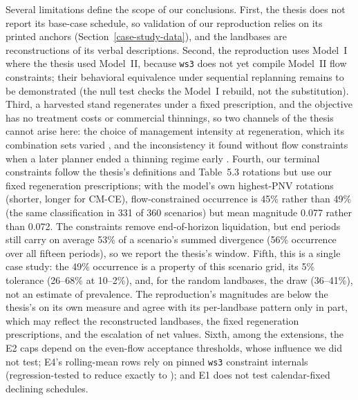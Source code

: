 Several limitations define the scope of our conclusions. First, the thesis does not report its base-case schedule, so validation of our reproduction relies on its printed anchors (Section~\ref{case-study-data}), and the landbases are reconstructions of its verbal descriptions. Second, the reproduction uses Model~I where the thesis used Model~II, because \texttt{ws3} does not yet compile Model~II flow constraints; their behavioral equivalence under sequential replanning remains to be demonstrated (the null test checks the Model~I rebuild, not the substitution). Third, a harvested stand regenerates under a fixed prescription, and the objective has no treatment costs or commercial thinnings, so two channels of the thesis cannot arise here: the choice of management intensity at regeneration, which its combination sets varied \citep[pp.~74, 81]{daugherty1991credibility}, and the inconsistency it found without flow constraints when a later planner ended a thinning regime early \citep[p.~123]{daugherty1991credibility}. Fourth, our terminal constraints follow the thesis's definitions and Table~5.3 rotations but use our fixed regeneration prescriptions; with the model's own highest-PNV rotations (shorter, longer for CM-CE), flow-constrained occurrence is 45\% rather than 49\% (the same classification in 331 of 360 scenarios) but mean magnitude 0.077 rather than 0.072. The constraints remove end-of-horizon liquidation, but end periods still carry on average 53\% of a scenario's summed divergence (56\% occurrence over all fifteen periods), so we report the thesis's window. Fifth, this is a single case study: the 49\% occurrence is a property of this scenario grid, its 5\% tolerance (26--68\% at 10--2\%), and, for the random landbases, the draw (36--41\%), not an estimate of prevalence. The reproduction's magnitudes are below the thesis's on its own measure and agree with its per-landbase pattern only in part, which may reflect the reconstructed landbases, the fixed regeneration prescriptions, and the escalation of net values. Sixth, among the extensions, the E2 caps depend on the even-flow acceptance thresholds, whose influence we did not test; E4's rolling-mean rows rely on pinned \texttt{ws3} constraint internals (regression-tested to reduce exactly to ); and E1 does not test calendar-fixed declining schedules.
